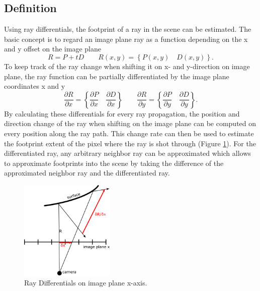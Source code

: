 \documentclass[12pt]{article}
\newcommand{\pardiff}[2]{\frac{\partial #1}{\partial #2} }
\begin{document}
\subsection{Definition}
Using ray differentials, the footprint of a ray in the scene can be estimated. The basic concept is to regard an image plane ray as a function depending on the x and y offset on the image plane
\begin{equation}
R = P + tD 
\qquad
R(x,y) = \left\{ P(x,y) \quad D(x,y) \right\}
.\end{equation}
To keep track of the ray change when shifting it on x- and y-direction on image plane, the ray function can be partially differentiated by the image plane coordinates x and y
\begin{equation}
\pardiff{R}{x} = \left\{ \pardiff{P}{x} \quad \pardiff{D}{x} \right\}
\qquad
\pardiff{R}{y} = \left\{ \pardiff{P}{y} \quad \pardiff{D}{y} \right\}
.\end{equation}
By calculating these differentials for every ray propagation, the position and direction change of the ray when shifting on the image plane can be computed on every position along the ray path. This change rate can then be used to estimate the footprint extent of the pixel where the ray is shot through (Figure \ref{fig:raydiff}). For the differentiated ray, any arbitrary neighbor ray can be approximated which allows to approximate footprints into the scene by taking the difference of the approximated neighbor ray and the differentiated ray.

\begin{figure}[h]
	\centering
	\includegraphics[width=0.4\textwidth]{images/raydiff}
	\caption{Ray Differentials on image plane x-axis.}
	\label{fig:raydiff}
\end{figure}
\end{document}
